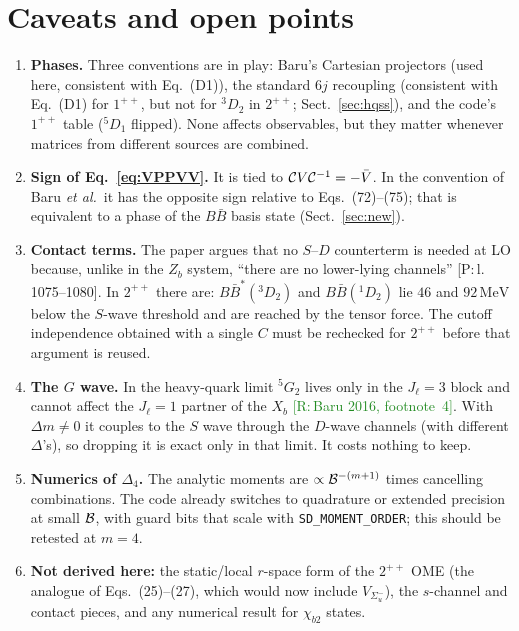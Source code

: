 \documentclass[11pt,a4paper]{article}
\newcommand{\tagP}[1]{\textcolor{blue!65!black}{\textsf{\small[P:\,#1]}}}
\newcommand{\tagR}[1]{\textcolor{ForestGreen}{\textsf{\small[R:\,#1]}}}
\newcommand{\BB}{B\bar B}
\newcommand{\BBst}{B\bar B^*}
\newcommand{\MeV}{\,\mathrm{MeV}}
\begin{document}
\section{Caveats and open points}
\label{sec:caveats}

\begin{enumerate}
\item \textbf{Phases.} Three conventions are in play: Baru's Cartesian projectors (used here, consistent with Eq.~(D1)), the standard 6$j$ recoupling (consistent with Eq.~(D1) for $1^{++}$, but not for $^3D_2$ in $2^{++}$; Sect.~\ref{sec:hqss}), and the code's $1^{++}$ table ($^5D_1$ flipped). None affects observables, but they matter whenever matrices from different sources are combined.
\item \textbf{Sign of Eq.~\eqref{eq:VPPVV}.} It is tied to ${\cal C}V{\cal C}^{-1}=-\bar V$. In the convention of Baru \emph{et al.}\ it has the opposite sign relative to Eqs.~(72)--(75); that is equivalent to a phase of the $\BB$ basis state (Sect.~\ref{sec:new}).
\item \textbf{Contact terms.} The paper argues that no $S$--$D$ counterterm is needed at LO because, unlike in the $Z_b$ system, ``there are no lower-lying channels'' \tagP{l.\,1075--1080}. In $2^{++}$ there are: $\BBst(^3D_2)$ and $\BB(^1D_2)$ lie $46$ and $92\MeV$ below the $S$-wave threshold and are reached by the tensor force. The cutoff independence obtained with a single $C$ must be rechecked for $2^{++}$ before that argument is reused.
\item \textbf{The $G$ wave.} In the heavy-quark limit $^5G_2$ lives only in the $J_\ell=3$ block and cannot affect the $J_\ell=1$ partner of the $X_b$ \tagR{Baru 2016, footnote~4}. With $\Delta m\neq0$ it couples to the $S$ wave through the $D$-wave channels (with different $\Delta$'s), so dropping it is exact only in that limit. It costs nothing to keep.
\item \textbf{Numerics of $\Delta_4$.} The analytic moments are $\propto{\cal B}^{-(m+1)}$ times cancelling combinations. The code already switches to quadrature or extended precision at small ${\cal B}$, with guard bits that scale with \texttt{SD\_MOMENT\_ORDER}; this should be retested at $m=4$.
\item \textbf{Not derived here:} the static/local $r$-space form of the $2^{++}$ OME (the analogue of Eqs.~(25)--(27), which would now include $V_{\Sigma_u^-}$), the $s$-channel and contact pieces, and any numerical result for $\chi_{b2}$ states.
\end{enumerate}
\end{document}
